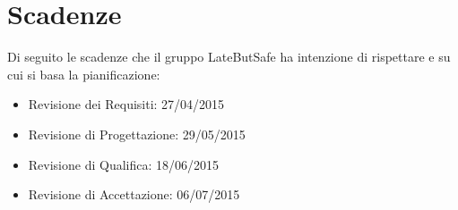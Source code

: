 \section{Scadenze}{
\label{sec:scadenze}
Di seguito le scadenze che il gruppo LateButSafe ha intenzione di rispettare e su cui si basa la pianificazione:

\begin{itemize}

\item Revisione dei Requisiti: 27/04/2015
\item Revisione di Progettazione: 29/05/2015
\item Revisione di Qualifica: 18/06/2015
\item Revisione di Accettazione: 06/07/2015

\end{itemize}
}